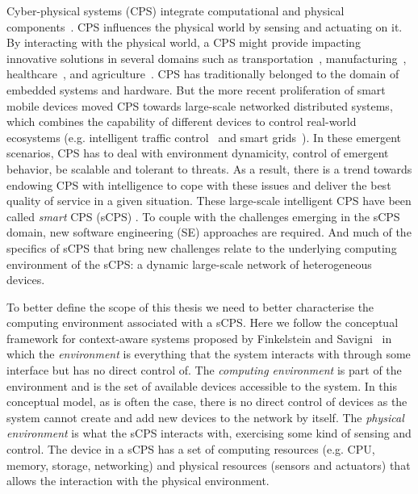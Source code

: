 Cyber-physical systems (CPS) integrate computational and physical components~\cite{lee_cyber_2008}. CPS influences the physical world by sensing and actuating on it. By interacting with the physical world, a CPS might provide impacting innovative solutions in several domains such as transportation~\cite{jia_survey_2016}, manufacturing~\cite{wang_current_2015}, healthcare~\cite{zhang_health-cps_2017}, and agriculture~\cite{an_agriculture_2017}.
CPS has traditionally belonged to the domain of embedded systems and hardware. But the more recent proliferation of smart mobile devices moved CPS towards large-scale networked distributed systems, which combines the capability of different devices to control real-world ecosystems (e.g. intelligent traffic control~\cite{sundar_implementing_2015} and smart grids~\cite{bayindir_smart_2016}).
 In these emergent scenarios, CPS has to deal with environment dynamicity, control of emergent behavior, be scalable and tolerant to threats. As a result, there is a trend towards endowing CPS with intelligence to cope with these issues and deliver the best quality of service in a given situation. These large-scale intelligent CPS have been called \emph{smart} CPS (sCPS) \cite{bures_software_2015}. To couple with the challenges emerging in the sCPS domain, new software engineering (SE) approaches are required\cite{bures_software_2015}.  And much of the specifics of sCPS that bring new challenges relate to the underlying computing environment of the sCPS: a dynamic large-scale network of heterogeneous devices. 

To better define the scope of this thesis we need to better characterise the computing environment associated with a sCPS. Here we follow the  conceptual framework for context-aware systems proposed by Finkelstein and Savigni~\cite{finkelstein_framework_2001} in which the \emph{environment} is everything that the system interacts with through some interface but has no direct control of. The \emph{computing environment} is part of the environment and is the set of available devices accessible to the system. In this conceptual model, as is often the case, there is no direct control of devices as the system cannot create and add new devices to the network by itself. The \emph{physical environment} is what the sCPS interacts with, exercising some kind of sensing and control.  The device in a sCPS has a set of computing resources (e.g. CPU, memory, storage, networking) and physical resources (sensors and actuators) that allows the interaction with the physical environment. 

